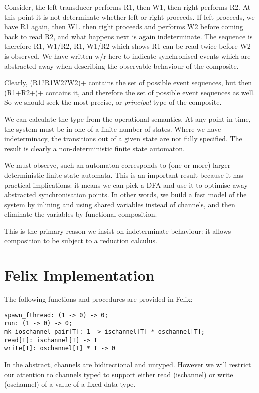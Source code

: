 \documentclass{article}
\begin{document}
Consider, the left transducer performs R1, then W1, then right
performs R2. At this point it is not determinate whether left
or right proceeds. If left proceeds, we have R1 again, then W1.
then right proceeds and performs W2 before coming back to read R2,
and what happens next is again indeterminate. The sequence is
therefore R1, W1/R2, R1, W1/R2 which shows R1 can be read twice
before W2 is observed. We have written w/r here to indicate synchronised
events which are abstracted away when describing the observable
behaviour of the composite.

Clearly, (R1?R1W2?W2)+ contains the set of possible event sequences,
but then (R1+R2+)+ contains it, and therefore the set of possible
event sequences as well. So we should seek the most precise, or
{\em principal} type of the composite.

We can calculate the type from the operational semantics.
At any point in time, the system must be in one of a finite
number of states. Where we have indeterminacy, the transitions
out of a given state are not fully specified. The result is
clearly a non-deterministic finite state automaton.

We must observe, such an automaton corresponds to (one or more) 
larger deterministic finite state automata. This is an important
result because it has practical implications: it means we can
pick a DFA and use it to optimise away abstracted synchronisation
points. In other words, we build a fast model of the system
by inlining and using shared variables instead of channels,
and then eliminate the variables by functional composition.

This is the primary reason we insist on indeterminate behaviour:
it allows composition to be subject to a reduction calculus.

\section{Felix Implementation}
The following functions and procedures are provided in Felix:

\begin{verbatim}
spawn_fthread: (1 -> 0) -> 0;
run: (1 -> 0) -> 0;
mk_ioschannel_pair[T]: 1 -> ischannel[T] * oschannel[T];
read[T]: ischannel[T] -> T
write[T]: oschannel[T] * T -> 0
\end{verbatim}

In the abstract, channels are bidirectional and untyped.
However we will restrict our attention to channels
typed to support either read (ischannel) or write (oschannel)
of a value of a fixed data type.
\end{document}
